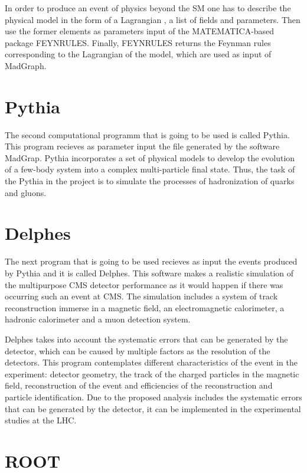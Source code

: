 In order to produce an event of physics beyond the SM one has to describe the physical model in the form of a Lagrangian , a list of fields and parameters. Then use the former elements as parameters input of the MATEMATICA-based package FEYNRULES. Finally, FEYNRULES returns the Feynman rules corresponding to the Lagrangian of the model, which are used as input of MadGraph.


\section{Pythia}

The second computational programm that is going to be used is called Pythia. This program recieves as parameter input the file generated by the software MadGrap. Pythia incorporates a set of physical models to develop the evolution of a few-body system into a complex multi-particle final state. Thus, the task of the Pythia in the project is to simulate the processes of hadronization of quarks and gluons.

\section{Delphes}

The next program that is going to be used recieves as input the events produced by Pythia and it is called Delphes. This software makes a realistic simulation of the multipurpose CMS detector performance as it would happen if there was occurring such an event at CMS. The simulation includes a system of track reconstruction immerse in a magnetic field, an electromagnetic calorimeter, a hadronic calorimeter and a muon detection system.

Delphes takes into account the systematic errors that can be generated by the detector, which can be caused by multiple factors as the resolution of the detectors. This program contemplates different characteristics of the event in the experiment: detector geometry, the track of the charged particles in the magnetic field, reconstruction of the event and efficiencies of the reconstruction and particle identification. Due to the proposed analysis includes the systematic errors that can be generated by the detector, it can be implemented in the experimental studies at the LHC. 

\section{ROOT}

